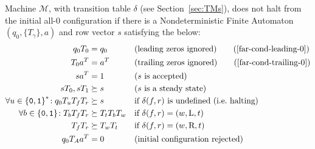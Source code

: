 \begin{theorem}
    \label{far-main-theorem}
    Machine $\mathcal{M}$, with transition table $\delta$ (see Section~\ref{sec:TMs}), does not halt from the initial all-0 configuration if there is a Nondeterministic Finite Automaton $(q_0, \{T_\gamma\}, a)$ and row vector $s$ satisfying the below:
    \begin{align}
        \label{far-cond-first}
        q_0 T_0                                    & = q_0
                                                   &                     & \text{(leading zeros ignored)}
        \tag{\ref{far-cond-leading-0}}
        \\
        T_0a\T                                     & = a\T
                                                   &                     & \text{(trailing zeros ignored)}
        \tag{\ref{far-cond-trailing-0}}
        \\
        sa\T                                       & = 1
                                                   &                     & \text{($s$ is accepted)}
        \label{far-cond-ass-accepted}
        \\
        sT_0,sT_1                                  & \succeq s
                                                   &                     & \text{($s$ is a steady state)}
        \label{far-cond-ass-steady}
        \\
        \forall u\in\balphabet^*\!: q_0T_u T_f T_r & \succeq s
                                                   &                     & \text{if $\delta(f,r)$ is undefined (\ie halting)}
        \label{far-cond-halt}
        \\
        \forall b\in\balphabet\!: T_b T_f T_r      & \succeq T_t T_b T_w
                                                   &                     & \text{if $\delta(f,r) = (w,\text{L},t)$}
        \label{far-cond-left}
        \\
        T_f T_r                                    & \succeq T_w T_t
                                                   &                     & \text{if $\delta(f,r) = (w,\text{R},t)$}
        \label{far-cond-last}
        \\
        q_0 T_A a\T                                & = 0
                                                   &                     & \text{(initial configuration rejected)}
        \label{far-cond-reject-start}
    \end{align}
\end{theorem}
